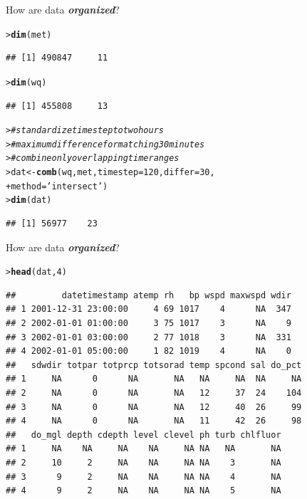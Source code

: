 \documentclass[serif]{beamer}\usepackage[]{graphicx}\usepackage[]{color}
\makeatletter
\newcommand{\hlnum}[1]{\textcolor[rgb]{0.686,0.059,0.569}{#1}}%
\newcommand{\hlstr}[1]{\textcolor[rgb]{0.192,0.494,0.8}{#1}}%
\newcommand{\hlcom}[1]{\textcolor[rgb]{0.678,0.584,0.686}{\textit{#1}}}%
\newcommand{\hlstd}[1]{\textcolor[rgb]{0.345,0.345,0.345}{#1}}%
\newcommand{\hlkwb}[1]{\textcolor[rgb]{0.69,0.353,0.396}{#1}}%
\newcommand{\hlkwc}[1]{\textcolor[rgb]{0.333,0.667,0.333}{#1}}%
\newcommand{\hlkwd}[1]{\textcolor[rgb]{0.737,0.353,0.396}{\textbf{#1}}}%
\newenvironment{kframe}{%
 \def\at@end@of@kframe{}%
 \ifinner\ifhmode%
  \def\at@end@of@kframe{\end{minipage}}%
  \begin{minipage}{\columnwidth}%
 \fi\fi%
 \def\FrameCommand##1{\hskip\@totalleftmargin \hskip-\fboxsep
 \colorbox{shadecolor}{##1}\hskip-\fboxsep
     \hskip-\linewidth \hskip-\@totalleftmargin \hskip\columnwidth}%
 \MakeFramed {\advance\hsize-\width
   \@totalleftmargin\z@ \linewidth\hsize
   \@setminipage}}%
 {\par\unskip\endMakeFramed%
 \at@end@of@kframe}
\newenvironment{knitrout}{}{} %
\newcommand{\Bigtxt}[1]{\textbf{\textit{#1}}}
\makeatother
\begin{document}
\begin{frame}[fragile]{How are data \Bigtxt{organized}?}
\begin{knitrout}\small
{}\color{fgcolor}\begin{kframe}
\begin{alltt}
\hlstd{> }\hlkwd{dim}\hlstd{(met)}
\end{alltt}
\begin{verbatim}
## [1] 490847     11
\end{verbatim}
\begin{alltt}
\hlstd{> }\hlkwd{dim}\hlstd{(wq)}
\end{alltt}
\begin{verbatim}
## [1] 455808     13
\end{verbatim}
\begin{alltt}
\hlstd{> }\hlcom{# standardize time step to two hours}
\hlstd{> }\hlcom{# maximum difference for matching 30 minutes}
\hlstd{> }\hlcom{# combine only overlapping time ranges}
\hlstd{> }\hlstd{dat} \hlkwb{<-} \hlkwd{comb}\hlstd{(wq, met,} \hlkwc{timestep} \hlstd{=} \hlnum{120}\hlstd{,} \hlkwc{differ} \hlstd{=} \hlnum{30}\hlstd{,}
\hlstd{+ }  \hlkwc{method} \hlstd{=} \hlstr{'intersect'}\hlstd{)}
\hlstd{> }\hlkwd{dim}\hlstd{(dat)}
\end{alltt}
\begin{verbatim}
## [1] 56977    23
\end{verbatim}
\end{kframe}
\end{knitrout}
\end{frame}

\begin{frame}[fragile]{How are data \Bigtxt{organized}?}
\begin{knitrout}\small
{}\color{fgcolor}\begin{kframe}
\begin{alltt}
\hlstd{> }\hlkwd{head}\hlstd{(dat,} \hlnum{4}\hlstd{)}
\end{alltt}
\begin{verbatim}
##         datetimestamp atemp rh   bp wspd maxwspd wdir
## 1 2001-12-31 23:00:00     4 69 1017    4      NA  347
## 2 2002-01-01 01:00:00     3 75 1017    3      NA    9
## 3 2002-01-01 03:00:00     2 77 1018    3      NA  331
## 4 2002-01-01 05:00:00     1 82 1019    4      NA    0
##   sdwdir totpar totprcp totsorad temp spcond sal do_pct
## 1     NA      0      NA       NA   NA     NA  NA     NA
## 2     NA      0      NA       NA   12     37  24    104
## 3     NA      0      NA       NA   12     40  26     99
## 4     NA      0      NA       NA   11     42  26     98
##   do_mgl depth cdepth level clevel ph turb chlfluor
## 1     NA    NA     NA    NA     NA NA   NA       NA
## 2     10     2     NA    NA     NA NA    3       NA
## 3      9     2     NA    NA     NA NA    4       NA
## 4      9     2     NA    NA     NA NA    5       NA
\end{verbatim}
\end{kframe}
\end{knitrout}
\end{frame}
\end{document}
